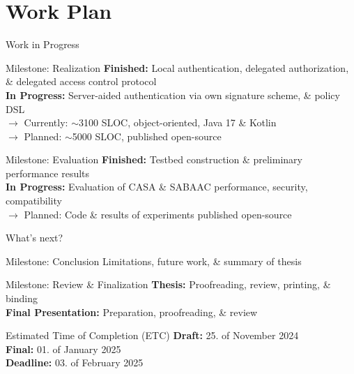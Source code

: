 \documentclass[en]{sdqbeamer}
\begin{document}
\section{Work Plan}
\begin{frame}{Work in Progress}
    \begin{blueblock}{Milestone: Realization}
        \textbf{Finished:} Local authentication, delegated authorization, \& delegated access control protocol 
        \\\textbf{In Progress:}  Server-aided authentication via own signature scheme, \& policy DSL
        \\$\rightarrow$ Currently: $\sim$3100 SLOC, object-oriented, Java 17 \& Kotlin
        \\$\rightarrow$ Planned: $\sim$5000 SLOC, published open-source
    \end{blueblock}
    \begin{blueblock}{Milestone: Evaluation}
        \textbf{Finished:} Testbed construction \& preliminary performance results
        \\\textbf{In Progress:} Evaluation of CASA \& SABAAC performance, security, compatibility
        \\$\rightarrow$ Planned: Code \& results of experiments published open-source
    \end{blueblock}
\end{frame}
\begin{frame}{What's next?}
    \begin{blueblock}{Milestone: Conclusion}
        Limitations, future work, \& summary of thesis
    \end{blueblock}
    \begin{blueblock}{Milestone: Review \& Finalization}
        \textbf{Thesis:} Proofreading, review, printing, \& binding 
        \\\textbf{Final Presentation:} Preparation, proofreading, \& review
    \end{blueblock}
    \begin{redblock}{Estimated Time of Completion (ETC)}
        \textbf{Draft:} 25. of November 2024
        \\\textbf{Final:} 01. of January 2025
        \\\textbf{Deadline:} 03. of February 2025
    \end{redblock}
\end{frame}
\end{document}
